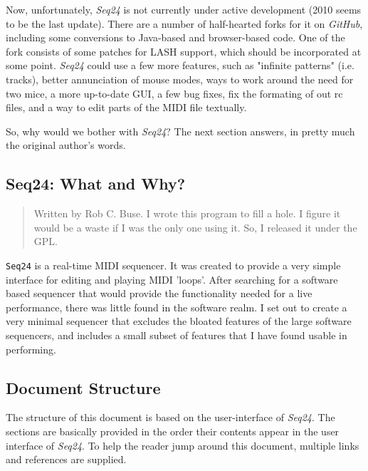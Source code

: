 \documentclass[
 11pt,
 twoside,
 a4paper,
 headinclude,
 footinclude,
 final                                 %
]{article}
\begin{document}
   Now, unfortunately, \textsl{Seq24} is not currently under active
   development (2010 seems to be the last update).  There are a number of
   half-hearted forks for it on \textsl{GitHub}, including some conversions
   to Java-based and browser-based code.  One of the fork consists of some
   patches for LASH support, which should be incorporated at some point.
   \textsl{Seq24} could use a few more features, such as "infinite
   patterns" (i.e. tracks), better annunciation of mouse modes,
   ways to work around the need for two mice, a more up-to-date GUI,
   a few bug fixes, fix the formating of out rc files,
   and a way to edit parts of the MIDI file textually.

   So, why would we bother with \textsl{Seq24}?  The next section answers,
   in pretty much the original author's words.

\subsection{Seq24: What and Why?}
\label{subsec:introduction_seq24_vs_others}

   \begin{quotation}
      Written by Rob C. Buse.  I wrote this program to fill a
      hole.  I figure it would be a waste if I was the only one
      using it.  So, I released it under the GPL.
   \end{quotation}

   \texttt{Seq24} is a real-time MIDI sequencer. It was created to 
   provide a very simple interface for editing and playing 
   MIDI 'loops'. After searching for a software based 
   sequencer that would provide the functionality needed for 
   a live performance, there was little found in the 
   software realm. I set out to create a very minimal sequencer 
   that excludes the bloated features of the large software 
   sequencers, and includes a small subset of features that 
   I have found usable in performing. 

\subsection{Document Structure}
\label{subsec:introduction_document_structure}

   The structure of this document is based on the user-interface of
   \textsl{Seq24}.
   The sections are basically provided
   in the order their contents appear in the user interface of
   \textsl{Seq24}.  To help the reader jump around this document, multiple
   links and references are supplied.
\end{document}
